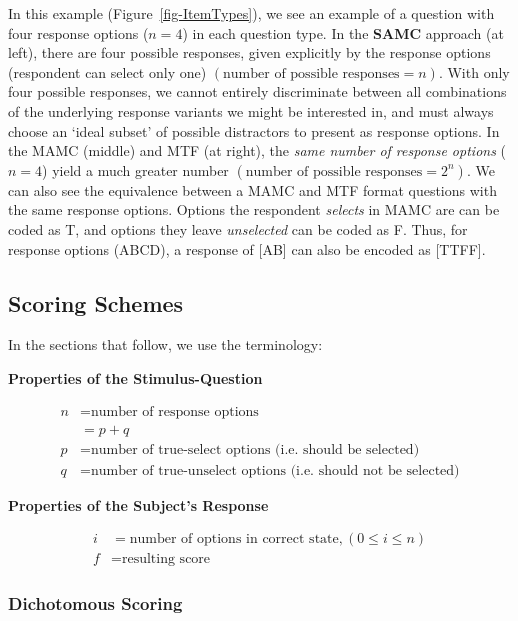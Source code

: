\documentclass[
  letterpaper,
  DIV=11,
  numbers=noendperiod]{scrreprt}
\begin{document}
In this example (Figure~\ref{fig-ItemTypes}), we see an example of a
question with four response options (\(n=4\)) in each question type. In
the \textbf{SAMC} approach (at left), there are four possible responses,
given explicitly by the response options (respondent can select only
one) \((\text{number of possible responses} = n)\). With only four
possible responses, we cannot entirely discriminate between all
combinations of the underlying response variants we might be interested
in, and must always choose an `ideal subset' of possible distractors to
present as response options. In the MAMC (middle) and MTF (at right),
the \emph{same number of response options} (\(n=4\)) yield a much
greater number \((\text{number of possible responses} = 2^{n})\). We can
also see the equivalence between a MAMC and MTF format questions with
the same response options. Options the respondent \emph{selects} in MAMC
are can be coded as T, and options they leave \emph{unselected} can be
coded as F. Thus, for response options (ABCD), a response of {[}AB{]}
can also be encoded as {[}TTFF{]}.

\hypertarget{scoring-schemes}{%
\subsection{Scoring Schemes}\label{scoring-schemes}}

In the sections that follow, we use the terminology:

\textbf{Properties of the Stimulus-Question}

\begin{align}
n &= \text{number of response options} \\  
  &= p + q \\ 
  p &= \text{number of true-select options (i.e. should be selected)} \\
  q &= \text{number of true-unselect options (i.e. should not be selected)} 
\end{align}

\textbf{Properties of the Subject's Response}

\begin{align} 
i &= \text{number of options in correct state}, (0 ≤ i ≤ n) \\ 
f &= \text{resulting score} 
\end{align}

\hypertarget{sec-absolute-scoring}{%
\subsubsection{Dichotomous Scoring}\label{sec-absolute-scoring}}
\end{document}
